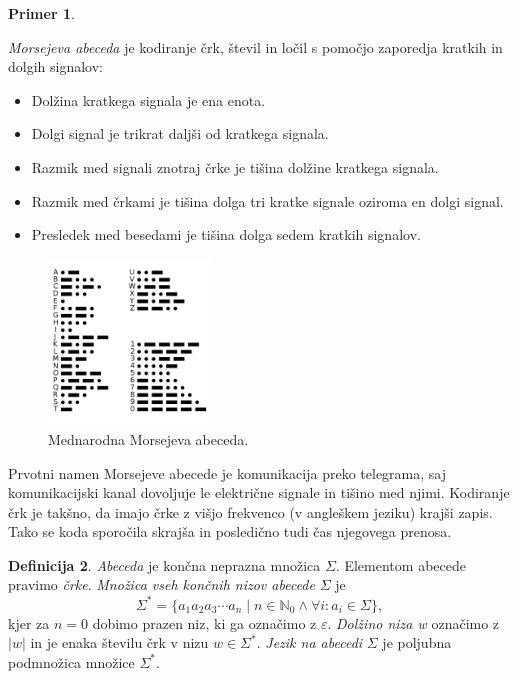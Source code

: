 \documentclass{amsart}
\newcommand{\N}{\mathbb{N}}
\theoremstyle{definition}
\newtheorem{definicija}{Definicija}[section]
\newtheorem{primer}[definicija]{Primer}
\theoremstyle{plain} %
\begin{document}
\begin{primer}\label{Morse}

    \textit{Morsejeva abeceda} je kodiranje črk, števil in ločil s pomočjo zaporedja kratkih
    in dolgih signalov:

    \begin{itemize}
        \item Dolžina kratkega signala je ena enota.
        \item Dolgi signal je trikrat daljši od kratkega signala.
        \item Razmik med signali znotraj črke je tišina dolžine kratkega signala.
        \item Razmik med črkami je tišina dolga tri kratke signale oziroma en dolgi signal.
        \item Presledek med besedami je tišina dolga sedem kratkih signalov.
    \end{itemize}

    \begin{figure}[h]
        \centering
        \includegraphics[width=4.3cm]{International_Morse_Code.svg.png}
        \caption{Mednarodna Morsejeva abeceda.}
        \label{fig:Morse}
    \end{figure}

    Prvotni namen Morsejeve abecede je komunikacija preko telegrama, saj komunikacijski
    kanal dovoljuje le električne signale in tišino med njimi. Kodiranje črk je takšno,
    da imajo črke z višjo frekvenco (v angleškem jeziku) krajši zapis. Tako se koda
    sporočila skrajša in posledično tudi čas njegovega prenosa.

\end{primer}

\begin{definicija}

    \textit{Abeceda} je končna neprazna množica $ \Sigma $. Elementom abecede pravimo \textit{črke}.
    \textit{Množica vseh končnih nizov abecede} $ \Sigma $ je
    \[
        \Sigma^* = \{ a_1 a_2 a_3 \cdots a_n \mid n \in \N_0 \land \forall i: a_i \in \Sigma \}, 
    \]
    kjer za $ n = 0 $ dobimo prazen niz, ki ga označimo z $ \varepsilon $.
    \textit{Dolžino niza w} označimo z $ |w| $ in je enaka številu črk v nizu $ w \in \Sigma^* $.
    \textit{Jezik na abecedi} $ \Sigma $ je poljubna podmnožica množice $ \Sigma^* $. 

\end{definicija}
\end{document}
